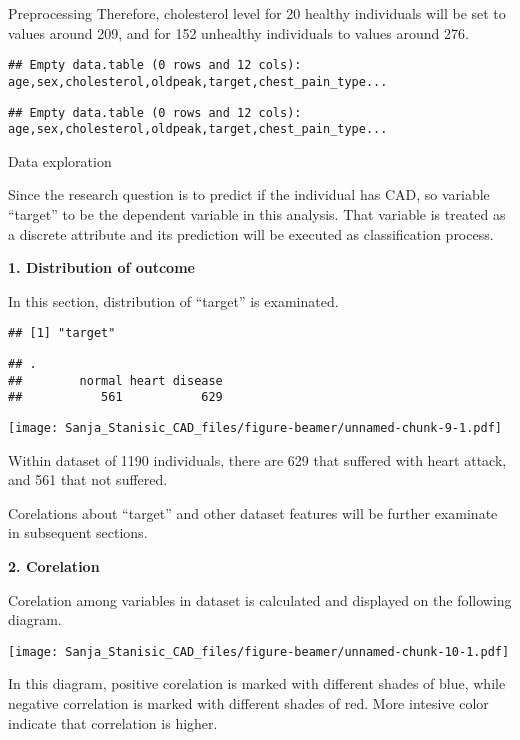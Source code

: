 \documentclass[
  ignorenonframetext,
]{beamer}
\begin{document}
\begin{frame}[fragile]{Preprocessing}
Therefore, cholesterol level for 20 healthy individuals will be set to
values around 209, and for 152 unhealthy individuals to values around
276.

\begin{verbatim}
## Empty data.table (0 rows and 12 cols): age,sex,cholesterol,oldpeak,target,chest_pain_type...
\end{verbatim}

\begin{verbatim}
## Empty data.table (0 rows and 12 cols): age,sex,cholesterol,oldpeak,target,chest_pain_type...
\end{verbatim}

\end{frame}

\begin{frame}[fragile]{Data exploration}
\protect\hypertarget{data-exploration}{}

Since the research question is to predict if the individual has CAD, so
variable ``target'' to be the dependent variable in this analysis. That
variable is treated as a discrete attribute and its prediction will be
executed as classification process.

\textbf{1. Distribution of outcome}

In this section, distribution of ``target'' is examinated.

\begin{verbatim}
## [1] "target"
\end{verbatim}

\begin{verbatim}
## .
##        normal heart disease 
##           561           629
\end{verbatim}

\texttt{[image: Sanja\_Stanisic\_CAD\_files/figure-beamer/unnamed-chunk-9-1.pdf]}

Within dataset of 1190 individuals, there are 629 that suffered with
heart attack, and 561 that not suffered.

Corelations about ``target'' and other dataset features will be further
examinate in subsequent sections.

\textbf{2. Corelation}

Corelation among variables in dataset is calculated and displayed on the
following diagram.

\texttt{[image: Sanja\_Stanisic\_CAD\_files/figure-beamer/unnamed-chunk-10-1.pdf]}

In this diagram, positive corelation is marked with different shades of
blue, while negative correlation is marked with different shades of red.
More intesive color indicate that correlation is higher.


\end{frame}
\end{document}
